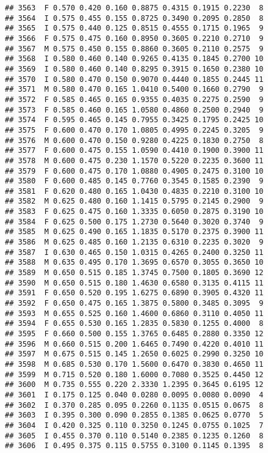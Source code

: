\documentclass[
]{article}
\begin{document}
\begin{verbatim}
## 3563  F 0.570 0.420 0.160 0.8875 0.4315 0.1915 0.2230  8
## 3564  I 0.575 0.455 0.155 0.8725 0.3490 0.2095 0.2850  8
## 3565  I 0.575 0.440 0.125 0.8515 0.4555 0.1715 0.1965  9
## 3566  F 0.575 0.475 0.160 0.8950 0.3605 0.2210 0.2710  9
## 3567  M 0.575 0.450 0.155 0.8860 0.3605 0.2110 0.2575  9
## 3568  I 0.580 0.460 0.140 0.9265 0.4135 0.1845 0.2700 10
## 3569  I 0.580 0.460 0.140 0.8295 0.3915 0.1650 0.2380 10
## 3570  I 0.580 0.470 0.150 0.9070 0.4440 0.1855 0.2445 11
## 3571  M 0.580 0.470 0.165 1.0410 0.5400 0.1660 0.2790  9
## 3572  F 0.585 0.465 0.165 0.9355 0.4035 0.2275 0.2590  9
## 3573  F 0.585 0.460 0.165 1.0580 0.4860 0.2500 0.2940  9
## 3574  F 0.595 0.465 0.145 0.7955 0.3425 0.1795 0.2425 10
## 3575  F 0.600 0.470 0.170 1.0805 0.4995 0.2245 0.3205  9
## 3576  M 0.600 0.470 0.150 0.9280 0.4225 0.1830 0.2750  8
## 3577  F 0.600 0.475 0.155 1.0590 0.4410 0.1900 0.3900 11
## 3578  M 0.600 0.475 0.230 1.1570 0.5220 0.2235 0.3600 11
## 3579  F 0.600 0.475 0.170 1.0880 0.4905 0.2475 0.3100 10
## 3580  F 0.600 0.485 0.145 0.7760 0.3545 0.1585 0.2390  9
## 3581  F 0.620 0.480 0.165 1.0430 0.4835 0.2210 0.3100 10
## 3582  M 0.625 0.480 0.160 1.1415 0.5795 0.2145 0.2900  9
## 3583  F 0.625 0.475 0.160 1.3335 0.6050 0.2875 0.3190 10
## 3584  F 0.625 0.500 0.175 1.2730 0.5640 0.3020 0.3740  9
## 3585  M 0.625 0.490 0.165 1.1835 0.5170 0.2375 0.3900 11
## 3586  M 0.625 0.485 0.160 1.2135 0.6310 0.2235 0.3020  9
## 3587  I 0.630 0.465 0.150 1.0315 0.4265 0.2400 0.3250 11
## 3588  M 0.635 0.495 0.170 1.3695 0.6570 0.3055 0.3650 10
## 3589  M 0.650 0.515 0.185 1.3745 0.7500 0.1805 0.3690 12
## 3590  M 0.650 0.515 0.180 1.4630 0.6580 0.3135 0.4115 11
## 3591  F 0.650 0.520 0.195 1.6275 0.6890 0.3905 0.4320 11
## 3592  F 0.650 0.475 0.165 1.3875 0.5800 0.3485 0.3095  9
## 3593  M 0.655 0.525 0.160 1.4600 0.6860 0.3110 0.4050 11
## 3594  F 0.655 0.530 0.165 1.2835 0.5830 0.1255 0.4000  8
## 3595  F 0.660 0.500 0.155 1.3765 0.6485 0.2880 0.3350 12
## 3596  M 0.660 0.515 0.200 1.6465 0.7490 0.4220 0.4010 11
## 3597  M 0.675 0.515 0.145 1.2650 0.6025 0.2990 0.3250 10
## 3598  M 0.685 0.530 0.170 1.5600 0.6470 0.3830 0.4650 11
## 3599  M 0.715 0.520 0.180 1.6000 0.7080 0.3525 0.4450 12
## 3600  M 0.735 0.555 0.220 2.3330 1.2395 0.3645 0.6195 12
## 3601  I 0.175 0.125 0.040 0.0280 0.0095 0.0080 0.0090  4
## 3602  I 0.370 0.285 0.095 0.2260 0.1135 0.0515 0.0675  8
## 3603  I 0.395 0.300 0.090 0.2855 0.1385 0.0625 0.0770  5
## 3604  I 0.420 0.325 0.110 0.3250 0.1245 0.0755 0.1025  7
## 3605  I 0.455 0.370 0.110 0.5140 0.2385 0.1235 0.1260  8
## 3606  I 0.495 0.375 0.115 0.5755 0.3100 0.1145 0.1395  8

\end{verbatim}
\end{document}
